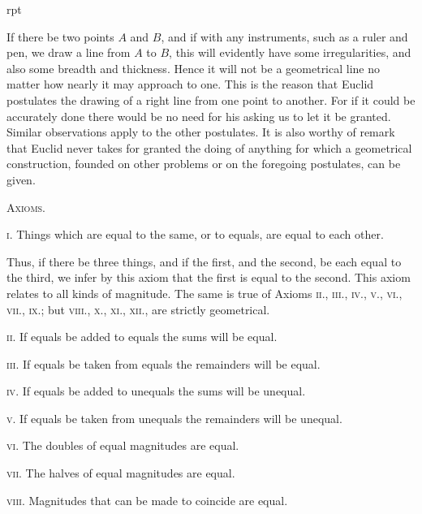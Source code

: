 \documentclass[oneside]{book}
\newcounter{wrapwidth}
\newcommand\imgflow[3]{
\setcounter{wrapwidth}{#1}

\begin{wrapfigure}[#2]{r}{\value{wrapwidth}pt}
\begin{center}
\vspace{-0.3in}

\end{center}
\end{wrapfigure}
}
\begin{document}
\imgflow{100}{3}{f010}
\begin{footnotesize}
If there be two points $A$ and $B$, and if with any instruments,
such as a ruler and pen, we draw a line
from $A$ to $B$, this will evidently have some
irregularities, and also some breadth and
thickness. Hence it will not be a geometrical line no matter how
nearly it may approach to one. This is the reason that Euclid
postulates the drawing of a right line from one point to another.
For if it could be accurately done there would be no need for his
asking us to let it be granted. Similar observations apply to the
other postulates. It is also worthy of remark that Euclid never
takes for granted the doing of anything for which a geometrical
construction, founded on other problems or on the foregoing postulates,
can be given.
\par\end{footnotesize}


\begin{center}
\textsc{Axioms.}
\end{center}

\textsc{i}. Things which are equal to the same, or to equals,
are equal to each other.

\begin{footnotesize}
Thus, if there be three things, and if the first, and the second,
be each equal to the third, we infer by this axiom that the first is
equal to the second. This axiom relates to all kinds of magnitude.
The same is true of Axioms \textsc{ii}., \textsc{iii}., \textsc{iv}., \textsc{v}., \textsc{vi}., \textsc{vii}., \textsc{ix}.;
but \textsc{viii}., \textsc{x}., \textsc{xi}., \textsc{xii}., are strictly geometrical.
\par\end{footnotesize}

\textsc{ii}. If equals be added to equals the sums will be
equal.

\textsc{iii}. If equals be taken from equals the remainders
will be equal.

\textsc{iv}. If equals be added to unequals the sums will be
unequal.

\textsc{v}. If equals be taken from unequals the remainders
will be unequal.

\textsc{vi}. The doubles of equal magnitudes are equal.

\textsc{vii}. The halves of equal magnitudes are equal.

\textsc{viii}. Magnitudes that can be made to coincide are
equal.
\end{document}
